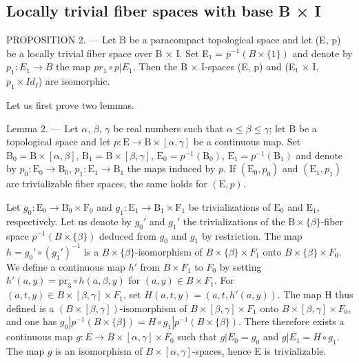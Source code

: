 \subsection{Locally trivial fiber spaces with base B × I}

PROPOSITION 2. --- Let B be a paracompact topological space and let (E, p) be a locally trivial fiber space over B × I. Set E₁ = \(\overline{p}^{-1}(B \times \{1\})\) and denote by \(p_{1}: E_{1} \to B\) the map \(pr_{1} \circ p | E_{1}\). Then the B × I-spaces (E, p) and (E₁ × I, \(p_{1} \times Id_{I}\)) are isomorphic.

Let us first prove two lemmas.

Lemma 2. --- Let \(\alpha\), \(\beta\), \(\gamma\) be real numbers such that \(\alpha \leqslant \beta \leqslant \gamma\); let B be a topological space and let \(p: \mathrm{E} \to \mathrm{B} \times [\alpha, \gamma]\) be a continuous map. Set \(\mathrm{B}_0 = \mathrm{B} \times [\alpha, \beta]\), \(\mathrm{B}_1 = \mathrm{B} \times [\beta, \gamma]\), \(\mathrm{E}_0 = p^{-1}(\mathrm{B}_0)\), \(\mathrm{E}_1 = p^{-1}(\mathrm{B}_1)\) and denote by \(p_0: \mathrm{E}_0 \to \mathrm{B}_0\), \(p_1: \mathrm{E}_1 \to \mathrm{B}_1\) the maps induced by \(p\). If \((\mathrm{E}_0, p_0)\) and \((\mathrm{E}_1, p_1)\) are trivializable fiber spaces, the same holds for \((\mathrm{E}, p)\).

Let \(g_0 \colon \mathrm{E}_0 \to \mathrm{B}_0 \times \mathrm{F}_0\) and \(g_1 \colon \mathrm{E}_1 \to \mathrm{B}_1 \times \mathrm{F}_1\) be trivializations of \(\mathrm{E}_0\) and \(\mathrm{E}_1\), respectively. Let us denote by \(g_0'\) and \(g_1'\) the trivializations of the \(\mathrm{B} \times \{\beta\}\)-fiber space \(p^{-1}(B \times \{\beta\})\) deduced from \(g_0\) and \(g_1\) by restriction. The map \(h = g_0' \circ (g_1')^{-1}\) is a \(B \times \{\beta\}\)-isomorphism of \(B \times \{\beta\} \times F_1\) onto \(B \times \{\beta\} \times F_0\). We define a continuous map \(h'\) from \(B \times F_1\) to \(F_0\) by setting \(h'(a, y) = \mathrm{pr}_3 \circ h(a, \beta, y)\) for \((a, y) \in B \times F_1\). For \((a, t, y) \in B \times [\beta, \gamma] \times F_1\), set \(H(a, t, y) = (a, t, h'(a, y))\). The map H thus defined is a \((B \times [\beta, \gamma])\)-isomorphism of \(B \times [\beta, \gamma] \times F_1\) onto \(B \times [\beta, \gamma] \times F_0\), and one has \(g_0 | p^{-1}(B \times \{\beta\}) = H \circ g_1 | p^{-1}(B \times \{\beta\})\). There therefore exists a continuous map \(g \colon E \to B \times [\alpha, \gamma] \times F_0\) such that \(g | E_0 = g_0\) and \(g | E_1 = H \circ g_1\). The map \(g\) is an isomorphism of \(B \times [\alpha, \gamma]\)-spaces, hence E is trivializable.

